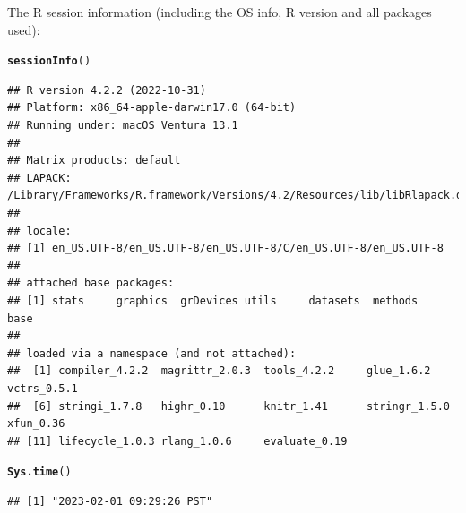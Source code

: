 \documentclass{article}\usepackage[]{graphicx}\usepackage[]{xcolor}
\makeatletter
\newcommand{\hlstd}[1]{\textcolor[rgb]{0.345,0.345,0.345}{#1}}%
\newcommand{\hlkwd}[1]{\textcolor[rgb]{0.737,0.353,0.396}{\textbf{#1}}}%
\newenvironment{kframe}{%
 \def\at@end@of@kframe{}%
 \ifinner\ifhmode%
  \def\at@end@of@kframe{\end{minipage}}%
  \begin{minipage}{\columnwidth}%
 \fi\fi%
 \def\FrameCommand##1{\hskip\@totalleftmargin \hskip-\fboxsep
 \colorbox{shadecolor}{##1}\hskip-\fboxsep
     \hskip-\linewidth \hskip-\@totalleftmargin \hskip\columnwidth}%
 \MakeFramed {\advance\hsize-\width
   \@totalleftmargin\z@ \linewidth\hsize
   \@setminipage}}%
 {\par\unskip\endMakeFramed%
 \at@end@of@kframe}
\newenvironment{knitrout}{}{} %
\makeatother
\begin{document}
The R session information (including the OS info, R version and all
packages used):

\begin{knitrout}
\color{fgcolor}\begin{kframe}
\begin{alltt}
\hlkwd{sessionInfo}\hlstd{()}
\end{alltt}
\begin{verbatim}
## R version 4.2.2 (2022-10-31)
## Platform: x86_64-apple-darwin17.0 (64-bit)
## Running under: macOS Ventura 13.1
## 
## Matrix products: default
## LAPACK: /Library/Frameworks/R.framework/Versions/4.2/Resources/lib/libRlapack.dylib
## 
## locale:
## [1] en_US.UTF-8/en_US.UTF-8/en_US.UTF-8/C/en_US.UTF-8/en_US.UTF-8
## 
## attached base packages:
## [1] stats     graphics  grDevices utils     datasets  methods   base     
## 
## loaded via a namespace (and not attached):
##  [1] compiler_4.2.2  magrittr_2.0.3  tools_4.2.2     glue_1.6.2      vctrs_0.5.1    
##  [6] stringi_1.7.8   highr_0.10      knitr_1.41      stringr_1.5.0   xfun_0.36      
## [11] lifecycle_1.0.3 rlang_1.0.6     evaluate_0.19
\end{verbatim}
\begin{alltt}
\hlkwd{Sys.time}\hlstd{()}
\end{alltt}
\begin{verbatim}
## [1] "2023-02-01 09:29:26 PST"
\end{verbatim}
\end{kframe}
\end{knitrout}
\end{document}
